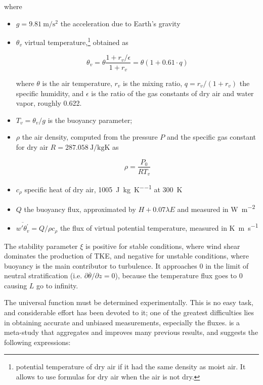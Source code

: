 \documentclass[a4paper,11pt]{kth-mag}
\begin{document}
\noindent where

\begin{itemize}
\item $g=\SI{9.81}{\meter\per\square\second}$ the acceleration due to Earth's gravity

\item $\theta_v$ virtual temperature,\footnote{potential temperature of dry air if it had the same density as moist air. It allows to use formulas for dry air when the air is not dry.} obtained as

\begin{equation}
\label{eq:vtemp}
\theta_v=\theta\frac{1+r_v/\epsilon}{1+r_v}=\theta(1+0.61\cdot q)
\end{equation}

\noindent where $\theta$ is the air temperature, $r_v$ is the mixing ratio, $q=r_v/(1+r_v)$ the specific humidity, and $\epsilon$ is the ratio of the gas constants of dry air and water vapor, roughly 0.622.

\item $T_v=\theta_v/g$ is the buoyancy parameter;

\item $\rho$ the air density, computed from the pressure $P$ and the specific gas constant for dry air $R=\SI{287.058}{\joule\per\kilo\gram\kelvin}$ as

$$
\rho=\frac{P_0}{RT_v}
$$


\item $c_\rho$ specific heat of dry air, \SI{1005}{\joule\per\kilo\gram\per\kelvin} at \SI{300}{\kelvin}
\item $Q$ the buoyancy flux, approximated by $H+0.07\lambda E$ and measured in \si{\watt\per\square\meter}
\item $\overline{w'\theta^\prime_v}=Q/\rho c_\rho$ the flux of virtual potential temperature, measured in \si{\kelvin\meter\per\second}
\end{itemize}

The stability parameter $\xi$ is positive for stable conditions, where wind shear dominates the production of TKE, and negative for unstable conditions, where buoyancy is the main contributor to turbulence. It approaches 0 in the limit of neutral stratification (i.e. $\partial\overline{\theta}/\partial z=0$), because the temperature flux goes to 0 causing $L$ go to infinity.

The universal function must be determined experimentally. This is no easy task, and considerable effort has been devoted to it; one of the greatest difficulties lies in obtaining accurate and unbiased measurements, especially the fluxes. \cite{hogstrom88} is a meta-study that aggregates and improves many previous results, and suggests the following expressions:
\end{document}
